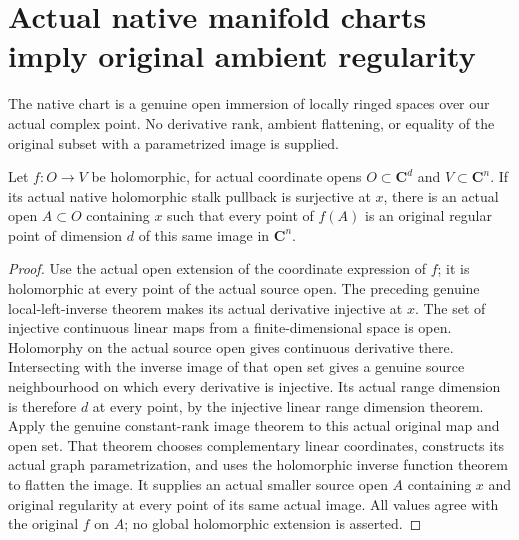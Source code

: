 \section{Actual native manifold charts imply original ambient regularity}

The native chart is a genuine open immersion of locally ringed spaces over
our actual complex point. No derivative rank, ambient flattening, or equality
of the original subset with a parametrized image is supplied.

\begin{theorem}
\label{hir:actual-native-stalk-surjection-regular-local-image}
\leanok
Let $f:O\to V$ be holomorphic, for actual coordinate opens
$O\subset\mathbf C^d$ and $V\subset\mathbf C^n$. If its actual native
holomorphic stalk pullback is surjective at $x$, there is an actual open
$A\subset O$ containing $x$ such that every point of $f(A)$ is an original
regular point of dimension $d$ of this same image in $\mathbf C^n$.
\end{theorem}
\begin{proof}
Use the actual open extension of the coordinate expression of $f$; it is
holomorphic at every point of the actual source open. The preceding genuine
local-left-inverse theorem makes its actual derivative injective at $x$.
The set of injective continuous linear maps from a finite-dimensional space
is open. Holomorphy on the actual source open gives continuous derivative
there. Intersecting with the inverse image of that open set gives a genuine
source neighbourhood on which every derivative is injective. Its actual
range dimension is therefore $d$ at every point, by the injective linear
range dimension theorem. Apply the genuine constant-rank image theorem to
this actual original map and open set. That theorem chooses complementary
linear coordinates, constructs its actual graph parametrization, and uses
the holomorphic inverse function theorem to flatten the image. It supplies
an actual smaller source open $A$ containing $x$ and original regularity
at every point of its same actual image. All values agree with the original
$f$ on $A$; no global holomorphic extension is asserted.
\end{proof}


